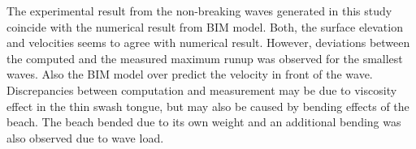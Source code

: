 


The experimental result from  the non-breaking  waves generated in this study coincide with the numerical result from BIM model. Both, the surface elevation and velocities seems to agree with numerical result. However, deviations between the computed and the measured maximum runup  was observed for the smallest waves. Also the BIM model over predict the velocity in front of the wave. Discrepancies between computation and measurement may be due to viscosity effect in the thin swash tongue, but may also be caused by bending effects of the beach. The beach bended due to its own weight and an additional bending was also observed due to wave load. 

